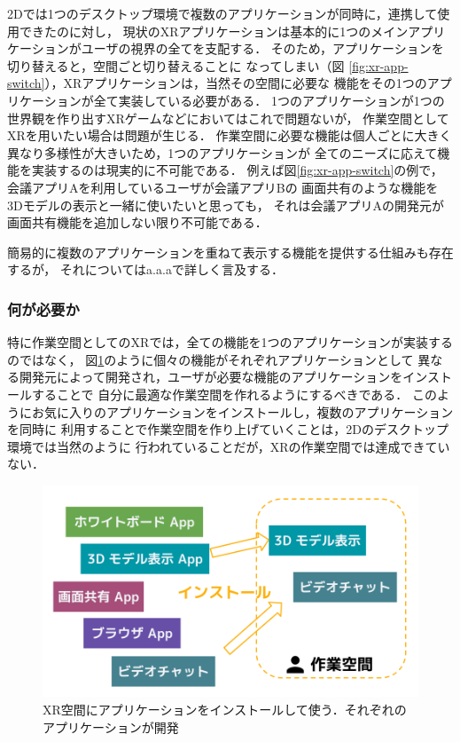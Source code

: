 2Dでは1つのデスクトップ環境で複数のアプリケーションが同時に，連携して使用できたのに対し，
現状のXRアプリケーションは基本的に1つのメインアプリケーションがユーザの視界の全てを支配する．
そのため，アプリケーションを切り替えると，空間ごと切り替えることに
なってしまい（図 \ref{fig:xr-app-switch}），XRアプリケーションは，当然その空間に必要な
機能をその1つのアプリケーションが全て実装している必要がある．
1つのアプリケーションが1つの世界観を作り出すXRゲームなどにおいてはこれで問題ないが，
作業空間としてXRを用いたい場合は問題が生じる．
作業空間に必要な機能は個人ごとに大きく異なり多様性が大きいため，1つのアプリケーションが
全てのニーズに応えて機能を実装するのは現実的に不可能である．
例えば図\ref{fig:xr-app-switch}の例で，会議アプリAを利用しているユーザが会議アプリBの
画面共有のような機能を3Dモデルの表示と一緒に使いたいと思っても，
それは会議アプリAの開発元が画面共有機能を追加しない限り不可能である．

簡易的に複数のアプリケーションを重ねて表示する機能を提供する仕組みも存在するが，
それについてはa.a.aで詳しく言及する． %

\subsubsection{何が必要か}

特に作業空間としてのXRでは，全ての機能を1つのアプリケーションが実装するのではなく，
図\ref*{fig:xr-app-install}のように個々の機能がそれぞれアプリケーションとして
異なる開発元によって開発され，ユーザが必要な機能のアプリケーションをインストールすることで
自分に最適な作業空間を作れるようにするべきである．
このようにお気に入りのアプリケーションをインストールし，複数のアプリケーションを同時に
利用することで作業空間を作り上げていくことは，2Dのデスクトップ環境では当然のように
行われていることだが，XRの作業空間では達成できていない．

\begin{figure}[htbp]
  \begin{minipage}[t]{0.50\linewidth}
    \centering
    \includegraphics[keepaspectratio, width=\linewidth]{fig/xr-app-install.png}
    \caption{XR空間にアプリケーションをインストールして使う．それぞれのアプリケーションが開発}
    \label{fig:xr-app-install}
  \end{minipage}
\end{figure}
